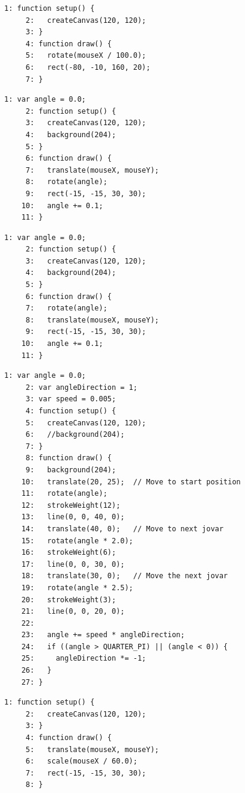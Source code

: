 \documentclass[a4j]{ltjsarticle}
\begin{document}
\vspace{1in}
\begin{lstlisting}[caption=Ex\_06\_04.js]
     1: function setup() {
     2:   createCanvas(120, 120);
     3: }
     4: function draw() {
     5:   rotate(mouseX / 100.0);
     6:   rect(-80, -10, 160, 20);
     7: }
\end{lstlisting}
\vspace{1in}
\begin{lstlisting}[caption=Ex\_06\_05.js]
     1: var angle = 0.0;
     2: function setup() {
     3:   createCanvas(120, 120);
     4:   background(204);  
     5: }
     6: function draw() {
     7:   translate(mouseX, mouseY);
     8:   rotate(angle);
     9:   rect(-15, -15, 30, 30);
    10:   angle += 0.1;
    11: }
\end{lstlisting}
\vspace{1in}
\begin{lstlisting}[caption=Ex\_06\_06.js]
     1: var angle = 0.0;
     2: function setup() {
     3:   createCanvas(120, 120);
     4:   background(204);
     5: }
     6: function draw() {
     7:   rotate(angle);
     8:   translate(mouseX, mouseY);
     9:   rect(-15, -15, 30, 30);
    10:   angle += 0.1;
    11: }
\end{lstlisting}
\vspace{1in}
\begin{lstlisting}[caption=Ex\_06\_07.js]
     1: var angle = 0.0;
     2: var angleDirection = 1;
     3: var speed = 0.005;
     4: function setup() {
     5:   createCanvas(120, 120);
     6:   //background(204);
     7: }
     8: function draw() {
     9:   background(204);
    10:   translate(20, 25);  // Move to start position
    11:   rotate(angle);
    12:   strokeWeight(12);
    13:   line(0, 0, 40, 0);
    14:   translate(40, 0);   // Move to next jovar
    15:   rotate(angle * 2.0);
    16:   strokeWeight(6);
    17:   line(0, 0, 30, 0);
    18:   translate(30, 0);   // Move the next jovar
    19:   rotate(angle * 2.5);
    20:   strokeWeight(3);
    21:   line(0, 0, 20, 0);
    22:   
    23:   angle += speed * angleDirection;
    24:   if ((angle > QUARTER_PI) || (angle < 0)) {
    25: 	angleDirection *= -1;
    26:   }
    27: }
\end{lstlisting}
\vspace{1in}
\begin{lstlisting}[caption=Ex\_06\_08.js]
     1: function setup() {
     2:   createCanvas(120, 120);
     3: }
     4: function draw() {
     5:   translate(mouseX, mouseY);
     6:   scale(mouseX / 60.0);
     7:   rect(-15, -15, 30, 30);
     8: }
\end{lstlisting}
\end{document}
